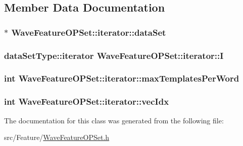 \subsection{Member Data Documentation}
\hypertarget{class_wave_feature_o_p_set_1_1iterator_a3eb82b0712290fe15e135390a02150fa}{
\subsubsection[{data\+Set}]{$\ast$ Wave\+Feature\+O\+P\+Set\+::iterator\+::data\+Set\hspace{0.3cm}{\ttfamily [private]}}}\label{class_wave_feature_o_p_set_1_1iterator_a3eb82b0712290fe15e135390a02150fa}
\hypertarget{class_wave_feature_o_p_set_1_1iterator_a20f89afc2f06d44b8aae87e33cc28ef6}{
\subsubsection[{I}]{\setlength{\rightskip}{0pt plus 5cm}data\+Set\+Type\+::iterator Wave\+Feature\+O\+P\+Set\+::iterator\+::\+I\hspace{0.3cm}{\ttfamily [private]}}}\label{class_wave_feature_o_p_set_1_1iterator_a20f89afc2f06d44b8aae87e33cc28ef6}
\hypertarget{class_wave_feature_o_p_set_1_1iterator_a94f22cdd6fcee7a6125b8b09f0384cb2}{
\subsubsection[{max\+Templates\+Per\+Word}]{\setlength{\rightskip}{0pt plus 5cm}int Wave\+Feature\+O\+P\+Set\+::iterator\+::max\+Templates\+Per\+Word\hspace{0.3cm}{\ttfamily [private]}}}\label{class_wave_feature_o_p_set_1_1iterator_a94f22cdd6fcee7a6125b8b09f0384cb2}
\hypertarget{class_wave_feature_o_p_set_1_1iterator_abf861ecdfdfb9474c1a55514d4854597}{
\subsubsection[{vec\+Idx}]{\setlength{\rightskip}{0pt plus 5cm}int Wave\+Feature\+O\+P\+Set\+::iterator\+::vec\+Idx\hspace{0.3cm}{\ttfamily [private]}}}\label{class_wave_feature_o_p_set_1_1iterator_abf861ecdfdfb9474c1a55514d4854597}


The documentation for this class was generated from the following file\+:\begin{DoxyCompactItemize}
\item 
src/\+Feature/\hyperlink{_wave_feature_o_p_set_8h}{Wave\+Feature\+O\+P\+Set.\+h}\end{DoxyCompactItemize}
